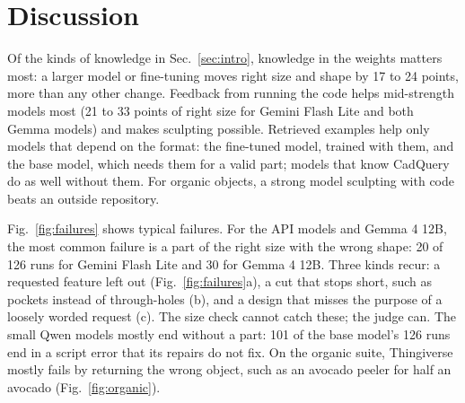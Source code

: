 \section{Discussion}
\label{sec:discussion}


Of the kinds of knowledge in Sec.~\ref{sec:intro}, knowledge in the weights matters most: a larger model or fine-tuning moves right size and shape by 17 to 24 points, more than any other change.
Feedback from running the code helps mid-strength models most (21 to 33 points of right size for Gemini Flash Lite and both Gemma models) and makes sculpting possible.
Retrieved examples help only models that depend on the format: the fine-tuned model, trained with them, and the base model, which needs them for a valid part; models that know CadQuery do as well without them.
For organic objects, a strong model sculpting with code beats an outside repository.

Fig.~\ref{fig:failures} shows typical failures.
For the API models and Gemma 4 12B, the most common failure is a part of the right size with the wrong shape: 20 of 126 runs for Gemini Flash Lite and 30 for Gemma 4 12B.
Three kinds recur: a requested feature left out (Fig.~\ref{fig:failures}a), a cut that stops short, such as pockets instead of through-holes (b), and a design that misses the purpose of a loosely worded request (c).
The size check cannot catch these; the judge can.
The small Qwen models mostly end without a part: 101 of the base model's 126 runs end in a script error that its repairs do not fix.
On the organic suite, Thingiverse mostly fails by returning the wrong object, such as an avocado peeler for half an avocado (Fig.~\ref{fig:organic}).



